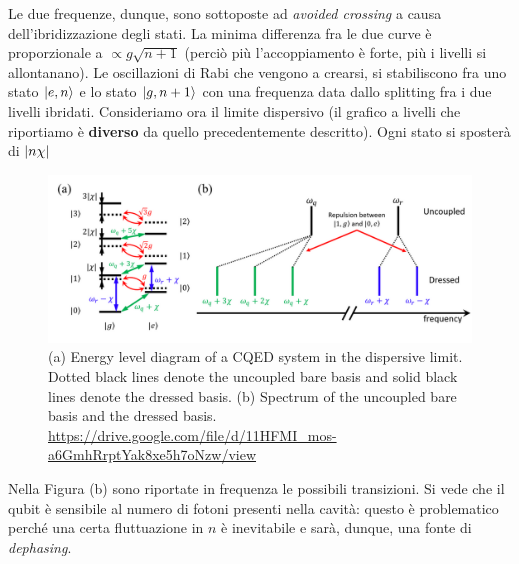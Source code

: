 \noindent Le due frequenze, dunque, sono sottoposte ad \textit{avoided crossing} a causa dell'ibridizzazione degli stati. La minima differenza fra le due curve è proporzionale a $\propto g\sqrt{n+1}$ (perciò più l'accoppiamento è forte, più i livelli si allontanano).
Le oscillazioni di Rabi che vengono a crearsi, si stabiliscono fra uno stato $\ket{e, n}$ e lo stato $\ket{g, n+1}$ con una frequenza data dallo splitting fra i due livelli ibridati.
Consideriamo ora il limite dispersivo (il grafico a livelli che riportiamo è \textbf{diverso} da quello precedentemente descritto). Ogni stato si sposterà di $\abs{n\chi}$
\begin{figure}[H]
    \centering
    \includegraphics[width=\textwidth]{images/energy_split_disp_cqed.png}
    \caption{(a) Energy level diagram of a CQED system in the dispersive limit. Dotted black lines
denote the uncoupled bare basis and solid black lines denote the dressed basis. (b) Spectrum of
the uncoupled bare basis and the dressed basis. \url{https://drive.google.com/file/d/11HFMI_mos-a6GmhRrptYak8xe5h7oNzw/view}}
\end{figure}
\noindent Nella Figura (b) sono riportate in frequenza le possibili transizioni. Si vede che il qubit è sensibile al numero di fotoni presenti nella cavità: questo è problematico perché una certa fluttuazione in $n$ è inevitabile e sarà, dunque, una fonte di \textit{dephasing}.

